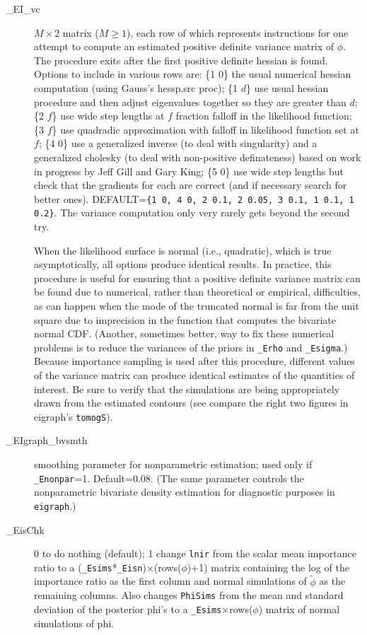 \documentclass[11pt,titlepage]{article}
\begin{document}
\begin{description}
\item[\_EI\_vc] $M\times 2$ matrix ($M\geq 1$), each row of which
  represents instructions for one attempt to compute an estimated
  positive definite variance matrix of $\phi$.  The procedure exits
  after the first positive definite hessian is found.  Options to
  include in various rows are: \{1 0\} the usual numerical hessian
  computation (using Gauss's hessp.src proc); \{1 $d$\} use usual
  hessian procedure and then adjust eigenvalues together so they are
  greater than $d$; \{2 $f$\} use wide step lengths at $f$ fraction
  falloff in the likelihood function; \{3 $f$\} use quadradic
  approximation with falloff in likelihood function set at $f$; \{4
  0\} use a generalized inverse (to deal with singularity) and a
  generalized cholesky (to deal with non-positive definateness) based
  on work in progress by Jeff Gill and Gary King; \{5 0\} use wide
  step lengths but check that the gradients for each are correct (and
  if necessary search for better ones).  DEFAULT=\texttt{\{1 0, 4 0, 2
    0.1, 2 0.05, 3 0.1, 1 0.1, 1 0.2\}}.  The variance computation
  only very rarely gets beyond the second try.

  When the likelihood surface is normal (i.e., quadratic), which is
  true asymptotically, all options produce identical results.  In
  practice, this procedure is useful for ensuring that a positive
  definite variance matrix can be found due to numerical, rather than
  theoretical or empirical, difficulties, as can happen when the mode
  of the truncated normal is far from the unit square due to
  imprecision in the function that computes the bivariate normal CDF.
  (Another, sometimes better, way to fix these numerical problems is
  to reduce the variances of the priors in \texttt{\_Erho} and
  \texttt{\_Esigma}.)  Because importance sampling is used after this
  procedure, different values of the variance matrix can produce
  identical estimates of the quantities of interest.  Be sure to
  verify that the simulations are being appropriately drawn from the
  estimated contours (see compare the right two figures in eigraph's
  \texttt{tomogS}).

\item[\_EIgraph\_bvsmth] smoothing parameter for nonparametric
  estimation; used only if \texttt{\_Enonpar}=1. Default=0.08.  (The
  same parameter controls the nonparametric bivariate density
  estimation for diagnostic purposes in \texttt{eigraph}.)

\item[\_EisChk] 0 to do nothing (default); 1 change \texttt{lnir} from
  the scalar mean importance ratio to a
  (\texttt{\_Esims}*\texttt{\_Eisn})$\times$(rows($\phi$)+1) matrix
  containing the log of the importance ratio as the first column and
  normal simulations of $\tilde{\phi}$ as the remaining columns.  Also
  changes \texttt{PhiSims} from the mean and standard deviation of the
  posterior phi's to a \texttt{\_Esims}$\times$rows($\phi$) matrix of
  normal simulations of phi.


\end{description}
\end{document}

